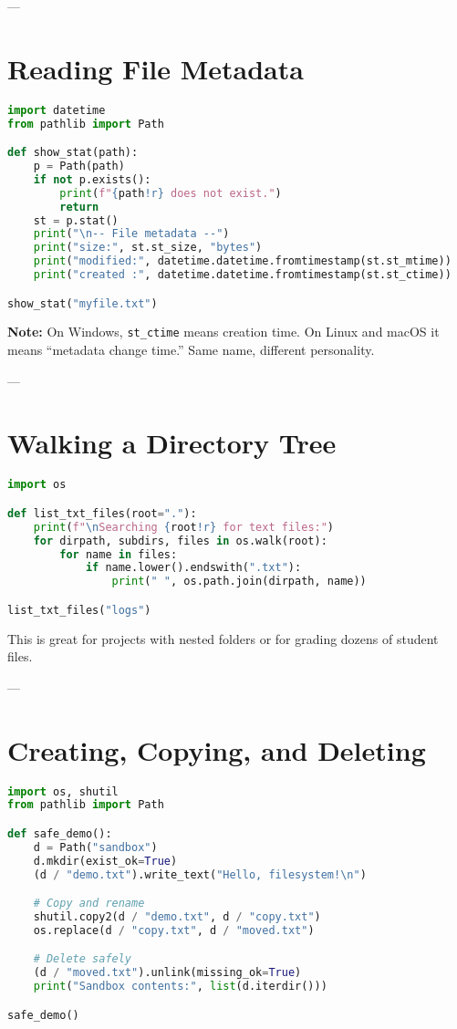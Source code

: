---

\section{Reading File Metadata}

\begin{lstlisting}[language=Python, caption={Inspect metadata and show friendly timestamps.}]
import datetime
from pathlib import Path

def show_stat(path):
    p = Path(path)
    if not p.exists():
        print(f"{path!r} does not exist.")
        return
    st = p.stat()
    print("\n-- File metadata --")
    print("size:", st.st_size, "bytes")
    print("modified:", datetime.datetime.fromtimestamp(st.st_mtime))
    print("created :", datetime.datetime.fromtimestamp(st.st_ctime))

show_stat("myfile.txt")
\end{lstlisting}

\textbf{Note:} On Windows, \texttt{st\_ctime} means creation time.
On Linux and macOS it means “metadata change time.”  
Same name, different personality.

---

\section{Walking a Directory Tree}

\begin{lstlisting}[language=Python, caption={List .txt files using os.walk.}]
import os

def list_txt_files(root="."):
    print(f"\nSearching {root!r} for text files:")
    for dirpath, subdirs, files in os.walk(root):
        for name in files:
            if name.lower().endswith(".txt"):
                print(" ", os.path.join(dirpath, name))

list_txt_files("logs")
\end{lstlisting}

This is great for projects with nested folders or for grading dozens of student files.

---

\section{Creating, Copying, and Deleting}

\begin{lstlisting}[language=Python, caption={Safe create, copy, rename, delete.}]
import os, shutil
from pathlib import Path

def safe_demo():
    d = Path("sandbox")
    d.mkdir(exist_ok=True)
    (d / "demo.txt").write_text("Hello, filesystem!\n")

    # Copy and rename
    shutil.copy2(d / "demo.txt", d / "copy.txt")
    os.replace(d / "copy.txt", d / "moved.txt")

    # Delete safely
    (d / "moved.txt").unlink(missing_ok=True)
    print("Sandbox contents:", list(d.iterdir()))

safe_demo()
\end{lstlisting}

